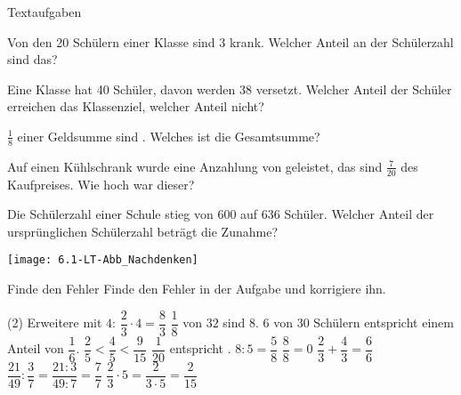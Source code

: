 \documentclass[lerntheke,12pt,a5paper,landscape]{arbeitsblatt}
\begin{document}
	\begin{karte2}[\iconEinzel]{Textaufgaben}
		\begin{minipage}{\textwidth-4.5cm}
			\begin{enuma}
				\item Von den 20 Schülern einer Klasse sind 3 krank. Welcher Anteil an der Schülerzahl sind das?

				\item Eine Klasse hat 40 Schüler, davon werden 38 versetzt. Welcher Anteil der Schüler erreichen das Klassenziel, welcher Anteil nicht?

				\item $\tfrac{1}{8}$ einer Geldsumme sind . Welches ist die Gesamtsumme?

				\item Auf einen Kühlschrank wurde eine Anzahlung von  geleistet, das sind $\tfrac{7}{20}$ des Kaufpreises. Wie hoch war dieser?

				\item Die Schülerzahl einer Schule stieg von 600 auf 636 Schüler. Welcher Anteil der ursprünglichen Schülerzahl beträgt die Zunahme?
			\end{enuma}
		\end{minipage}\hfill\begin{minipage}{4cm}
			\texttt{[image: 6.1-LT-Abb\_Nachdenken]}
		\end{minipage}
	\end{karte2}

	\leereKarte

	\begin{karte2}{Finde den Fehler}
		Finde den Fehler in der Aufgabe und korrigiere ihn.

		\begin{tasks}(2)
			\task Erweitere mit $4$: $\dfrac{2}{3}\cdot 4 = \dfrac{8}{3}$
			\task $\dfrac{1}{8}$ von $32$ sind $8$.
			\task $6$ von $30$ Schülern entspricht einem Anteil von $\dfrac{1}{6}$.
			\task $\dfrac{2}{5} < \dfrac{4}{5} < \dfrac{9}{15}$
			\task $\dfrac{1}{20}$ entspricht .
			\task $8: 5 =\dfrac{5}{8}$
			\task $\dfrac{8}{8} = 0$
			\task $\dfrac{2}{3} + \dfrac{4}{3} = \dfrac{6}{6}$
			\task $\dfrac{21}{49}: \dfrac{3}{7} = \dfrac{21 : 3}{49 : 7} = \dfrac{7}{7}$
			\task $\dfrac{2}{3}\cdot 5 = \dfrac{2}{3\cdot 5} = \dfrac{2}{15}$
		\end{tasks}
	\end{karte2}
\end{document}
